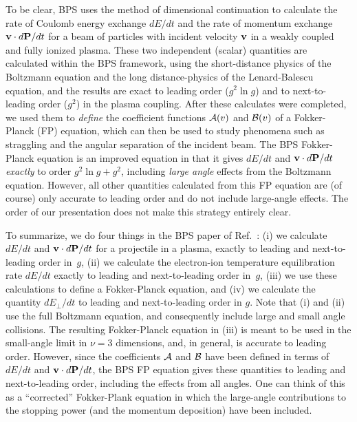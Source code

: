 \documentclass[preprint,12pt,eqsecnum,nofootinbib,amsmath,amssymb]{revtex4}
\begin{document}
To be clear,  BPS uses the method of dimensional
continuation to calculate the rate of Coulomb energy exchange 
$dE/dt$ and the rate of momentum exchange \hbox{${\bf v}
\cdot d{\bf P}/dt$} for a beam of particles with incident velocity
${\bf v}$ in a weakly coupled and fully ionized plasma. These 
two independent (scalar) quantities are calculated within the BPS 
framework, using the short-distance physics of the Boltzmann 
equation and the long distance-physics of the Lenard-Balescu 
equation, and the results are exact to leading order ($g^2\ln g$) 
and to next-to-leading order ($g^2$) in the plasma coupling.
After these calculates were completed, we used them to 
{\em define} the coefficient functions ${\cal A}(v)$ and 
${\cal B}(v)$ of a 
Fokker-Planck (FP) equation, which can then be used to study  
phenomena such as straggling and the angular separation of 
the incident beam. The BPS Fokker-Planck equation is an improved
equation in that it gives $dE/dt$ and ${\bf v} \cdot d{\bf P}/dt$ 
{\em exactly} to order $g^2 \ln g + g^2$, including {\em large 
angle} effects from the Boltzmann equation. However, all other 
quantities calculated from this FP equation are (of course) only 
accurate to leading order and do not include large-angle effects. 
The order of our presentation does not make this strategy 
entirely clear. 

To summarize, we do four things in the BPS paper of Ref.~\cite{BPS2005}:
(i) we calculate $dE/dt$ and ${\bf v} \cdot d{\bf P}/dt$ for a projectile 
in a plasma, exactly to leading and next-to-leading order in~$g$, (ii) we 
calculate the electron-ion temperature equilibration rate $dE/dt$ exactly  
to leading and next-to-leading order in~$g$, (iii) we use these calculations 
to define a Fokker-Planck equation, and (iv) we calculate the quantity 
$dE_\perp/dt$  to leading and next-to-leading order in $g$. Note that 
(i) and (ii) use the full Boltzmann equation, and consequently include 
large and small angle collisions. The resulting Fokker-Planck equation in 
(iii) is meant to be used in the small-angle limit in $\nu=3$ dimensions, 
and, in general, is accurate to leading order. However, since the coefficients 
${\cal A}$ and ${\cal B}$ have been defined in terms of $dE/dt$ and 
${\bf v} \cdot d{\bf P}/dt$, 
the BPS FP equation gives these quantities to leading and next-to-leading
order, including the effects from all angles. One can think of this as a 
``corrected'' Fokker-Plank equation in which the large-angle contributions
to the stopping power (and the momentum deposition) have been included.
\end{document}
